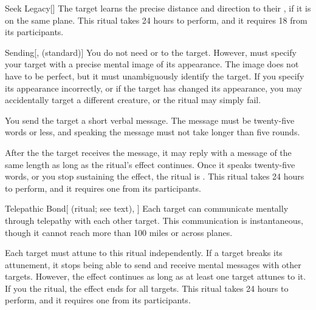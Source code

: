 \lowercase{\hypertarget{spell:Seek Legacy}{}}\label{spell:Seek Legacy}
\begin{freeability}[Rank 3]{\hypertarget{spell:Seek Legacy}{Seek Legacy}}[]
The target learns the precise distance and direction to their , if it is on the same plane.
This ritual takes 24 hours to perform, and it requires 18  from its participants.
\end{freeability}
\vspace{0.25em}



\lowercase{\hypertarget{spell:Sending}{}}\label{spell:Sending}
\begin{freeability}[Rank 4]{\hypertarget{spell:Sending}{Sending}}[,  (standard)]
You do not need  or  to the target.
However,  must specify your target with a precise mental image of its appearance.
The image does not have to be perfect, but it must unambiguously identify the target.
If you specify its appearance incorrectly, or if the target has changed its appearance, you may accidentally target a different creature, or the ritual may simply fail.

You send the target a short verbal message.
The message must be twenty-five words or less, and speaking the message must not take longer than five rounds.

After the the target receives the message, it may reply with a message of the same length as long as the ritual's effect continues.
Once it speaks twenty-five words, or you stop sustaining the effect, the ritual is .
This ritual takes 24 hours to perform, and it requires one  from its participants.
\end{freeability}
\vspace{0.25em}



\lowercase{\hypertarget{spell:Telepathic Bond}{}}\label{spell:Telepathic Bond}
\begin{attuneability}[Rank 4]{\hypertarget{spell:Telepathic Bond}{Telepathic Bond}}[ (ritual; see text), ]
Each target can communicate mentally through telepathy with each other target.
This communication is instantaneous, though it cannot reach more than 100 miles or across planes.

Each target must attune to this ritual independently.
If a target breaks its attunement, it stops being able to send and receive mental messages with other targets.
However, the effect continues as long as at least one target attunes to it.
If you  the ritual, the effect ends for all targets.
This ritual takes 24 hours to perform, and it requires one  from its participants.
\end{attuneability}
\vspace{0.25em}



